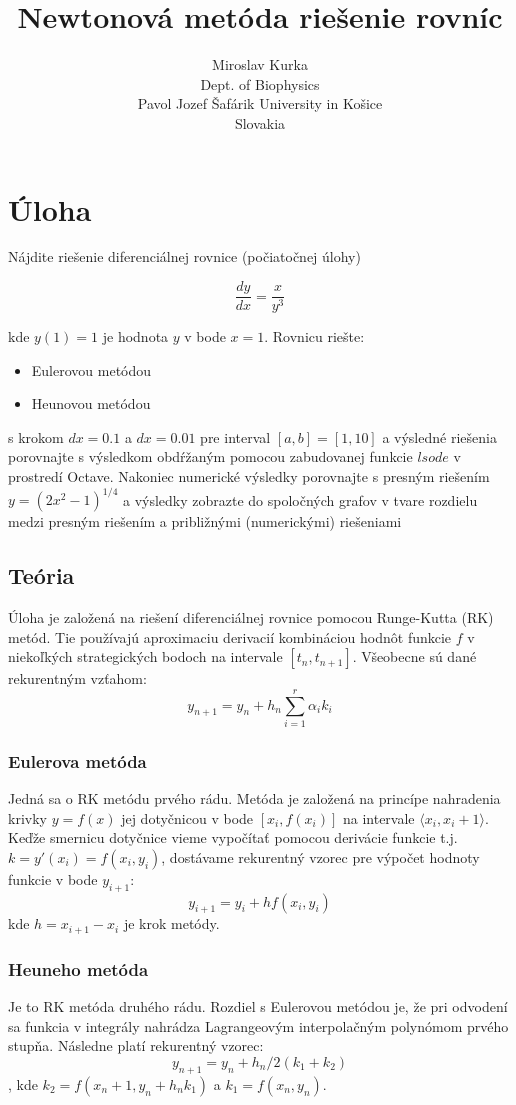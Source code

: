 \documentclass{article}
\title{Newtonová metóda riešenie rovníc}
\author{Miroslav Kurka\\
  \small Dept. of Biophysics\\
  \small Pavol Jozef Šafárik University in Košice\\
  \small Slovakia 
}
\theoremstyle{definition}
\theoremstyle{remark}
\begin{document}
\maketitle


\section{Úloha}
Nájdite riešenie diferenciálnej rovnice (počiatočnej úlohy)

$$\frac{dy}{dx}= \frac{x}{y^3}$$

kde $y(1) = 1$ je hodnota $y$ v bode $x = 1$.
Rovnicu riešte:
\begin{itemize}
  \item Eulerovou metódou
  \item Heunovou metódou
\end{itemize}

s krokom $dx = 0.1$ a $dx = 0.01$ pre interval $[a, b] = [1, 10]$ a výsledné riešenia
porovnajte s výsledkom obdŕžaným pomocou zabudovanej funkcie $lsode$ v prostredí
Octave.
Nakoniec numerické výsledky porovnajte s presným riešením
$y = (2x^2-1)^{1/4}$
a výsledky zobrazte do spoločných grafov v tvare rozdielu medzi presným riešením
a približnými (numerickými) riešeniami


\subsection{Teória}\label{sec:nothing}
Úloha je založená na riešení diferenciálnej rovnice pomocou Runge-Kutta (RK) metód. Tie používajú aproximaciu derivacií kombináciou hodnôt funkcie $f$ v niekoľkých strategických bodoch na intervale $[t_n, t_{n+1}]$\cite{Zukovic}. Všeobecne sú dané rekurentným vzťahom:
$$y_{n+1}=y_n+h_n\sum_{i=1}^r \alpha_i k_i$$
\subsubsection{Eulerova metóda}
Jedná sa o RK metódu prvého rádu. Metóda je založená na princípe nahradenia krivky $y=f(x)$ jej dotyčnicou v bode $[x_i,f(x_i)]$ na intervale $⟨x_i,x_i+1⟩$. Keďže smernicu dotyčnice vieme vypočítať pomocou derivácie funkcie t.j. $k=y'(x_i)=f(x_i,y_i)$, dostávame rekurentný vzorec pre výpočet hodnoty funkcie v bode $y_{i+1}$\cite{Web}:
$$y_{i+1}=y_i+hf(x_i,y_i)$$
kde $h = x_{i+1}-x_i$ je krok metódy.

\subsubsection{Heuneho metóda}
Je to RK metóda druhého rádu. Rozdiel s Eulerovou metódou je, že pri odvodení sa funkcia v integrály nahrádza Lagrangeovým interpolačným polynómom prvého stupňa\cite{Web}. Následne platí rekurentný vzorec: 
$$y_{n+1} = y_n + h_n/2 (k_1+k_2)$$
 , kde $k_2 =f(x_n+1,y_n+h_n k_1)$ a $k_1 =f(x_n,y_n)$.
\end{document}
